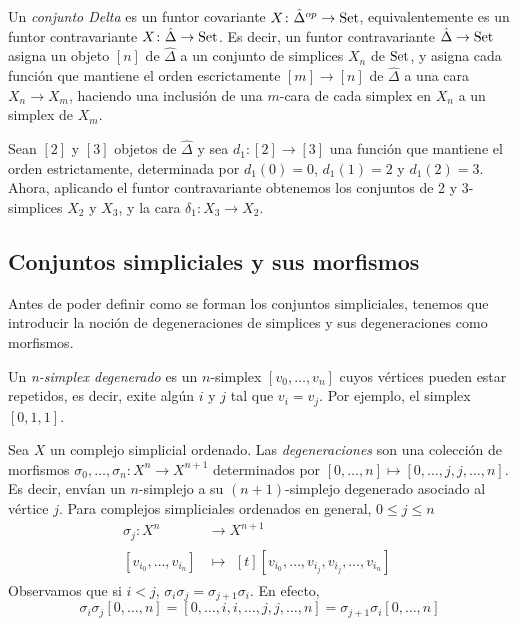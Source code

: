 \documentclass[../main.tex]{subfiles}
\begin{document}
\begin{defi}
    Un \emph{conjunto Delta} es un funtor covariante $X\colon \hat{\Delta}^{op} \to \mathop{\rm Set}$, equivalentemente es un funtor contravariante $X\colon \hat{\Delta} \to \mathop{\rm Set}$.
    Es decir, un funtor contravariante $\hat{\Delta} \to \mathop{\rm Set}$ asigna un objeto $[n]$ de $\hat{\Delta}$ a un conjunto de simplices $X_n$ de $\mathop{\rm Set}$, y asigna cada funci\'on que mantiene el orden escrictamente $[m]\to[n]$ de $\hat{\Delta}$ a una cara $X_n \to X_m$, haciendo una inclusi\'on de una $m$-cara de cada simplex en $X_n$ a un simplex de $X_m$.
\end{defi}
\begin{ex}
    Sean $[2]$ y $[3]$ objetos de $\hat{\Delta}$ y sea $d_1\colon [2] \to [3]$ una funci\'on que mantiene el orden estrictamente, determinada por $d_1(0)=0$, $d_1(1)=2$ y $d_1(2)=3$. Ahora, aplicando el funtor contravariante obtenemos los conjuntos de 2 y 3-simplices $X_2$ y $X_3$, y la cara $\delta_1\colon X_3 \to X_2$.
\end{ex}


\subsection{Conjuntos simpliciales y sus morfismos}
Antes de poder definir como se forman los conjuntos simpliciales, tenemos que introducir la noci\'on de degeneraciones de simplices y sus degeneraciones como morfismos.

\begin{defi}
    Un \emph{n-simplex degenerado} es un $n$-simplex $[v_0,\dots,v_n]$ cuyos v\'ertices pueden estar repetidos, es decir, exite alg\'un $i$ y $j$ tal que $v_i=v_j$. Por ejemplo, el simplex $[0,1,1]$.
\end{defi}
\begin{defi}
    Sea $X$ un complejo simplicial ordenado. Las \emph{degeneraciones} son una colecci\'on de morfismos $\sigma_0,\dots,\sigma_n\colon X^n\to X^{n+1}$ determinados por $[0,\dots,n] \mapsto [0,\dots,j,j,\dots,n]$. Es decir, env\'ian un $n$-simplejo a su $(n+1)$-simplejo degenerado asociado al v\'ertice $j$.
    Para complejos simpliciales ordenados en general, $0\le j \le n$
    \begin{align*}
        \sigma_j: X^n           & \longrightarrow X^{n+1} \\
        [v_{i_0},\dots,v_{i_n}] & \longmapsto\!
        \begin{aligned}[t]
            [v_{i_0},\dots,v_{i_j},v_{i_j},\dots,v_{i_n}]
        \end{aligned}
    \end{align*}
    Observamos que si $i<j$, $\sigma_i\sigma_j = \sigma_{j+1}\sigma_{i}$. En efecto, $$\sigma_i\sigma_j[0,\dots,n] = [0,\dots,i,i,\dots,j,j,\dots,n] = \sigma_{j+1}\sigma_{i}[0,\dots,n]$$
\end{defi}
\end{document}
